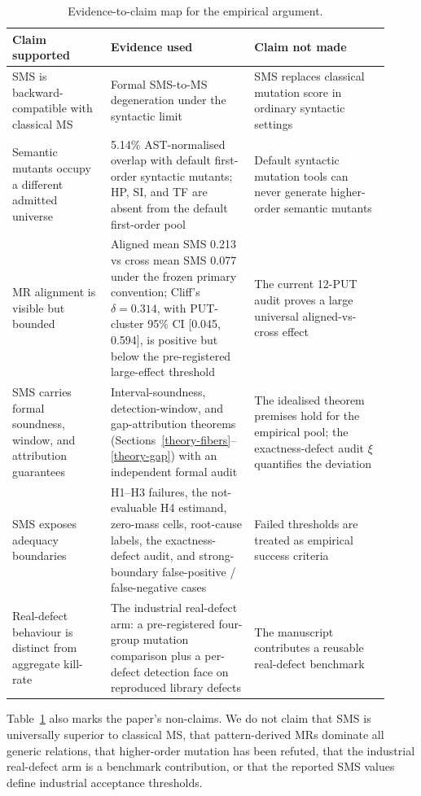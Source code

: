 \documentclass[review,12pt,authoryear]{elsarticle}
\begin{document}
\begin{table}[t]
\caption{Evidence-to-claim map for the empirical argument.}
\label{tab:claim-evidence-map}
\centering
\small
\begin{tabular}{p{0.24\linewidth}p{0.35\linewidth}p{0.33\linewidth}}
\toprule
Claim supported & Evidence used & Claim not made \\
\midrule
SMS is backward-compatible with classical MS & Formal SMS-to-MS
degeneration under the syntactic limit & SMS replaces classical mutation
score in ordinary syntactic settings \\
Semantic mutants occupy a different admitted universe & 5.14\%
AST-normalised overlap with default first-order syntactic mutants;
HP, SI, and TF are absent from the default first-order pool & Default
syntactic mutation tools can never generate higher-order semantic
mutants \\
MR alignment is visible but bounded & Aligned mean SMS 0.213 vs
cross mean SMS 0.077 under the frozen primary convention; Cliff's
\(\delta=0.314\), with PUT-cluster 95\% CI [0.045, 0.594], is positive
but below the pre-registered large-effect threshold & The current 12-PUT audit proves
a large universal aligned-vs-cross effect \\
SMS carries formal soundness, window, and attribution guarantees &
Interval-soundness, detection-window, and gap-attribution theorems
(Sections~\ref{theory-fibers}--\ref{theory-gap}) with an independent
formal audit & The idealised theorem premises hold for the empirical
pool; the exactness-defect audit \(\xi\) quantifies the deviation \\
SMS exposes adequacy boundaries & H1--H3 failures, the not-evaluable H4
estimand, zero-mass cells,
root-cause labels, the exactness-defect audit, and strong-boundary
false-positive / false-negative
cases & Failed thresholds are treated as empirical success criteria \\
Real-defect behaviour is distinct from aggregate kill-rate & The
industrial real-defect arm: a pre-registered four-group mutation
comparison plus a per-defect detection face on reproduced library
defects & The manuscript contributes a reusable
real-defect benchmark \\
\bottomrule
\end{tabular}
\normalsize
\end{table}

Table~\ref{tab:claim-evidence-map} also marks the paper's non-claims. We do not claim that SMS
is universally superior to classical MS, that pattern-derived MRs
dominate all generic relations, that higher-order mutation has been
refuted, that the industrial real-defect arm is a benchmark contribution, or that
the reported SMS values define industrial acceptance thresholds.
\end{document}
